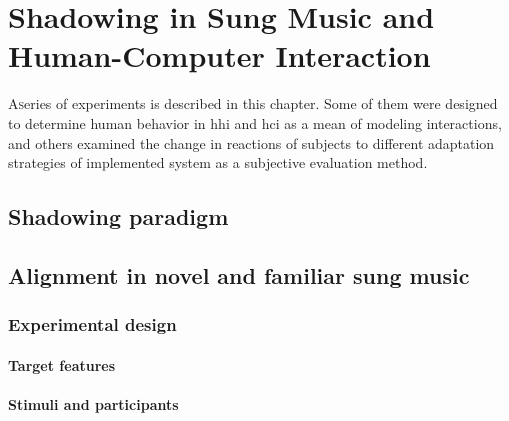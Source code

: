 \chapter{Shadowing in Sung Music and Human-Computer Interaction}
\label{chap:shadowing_in_sung_music_and_human_computer_interaction}

\lettrine{A} series of experiments is described in this chapter.
Some of them were designed to determine human behavior in \acl{hhi} and \ac{hci} as a mean of modeling interactions, and others examined the change in reactions of subjects to different adaptation strategies of implemented system as a subjective evaluation method.

\pagebreak

\section{Shadowing paradigm}
\label{sec:shadowing_paradigm}


\section{Alignment in novel and familiar sung music}
\label{sec:alignment_in_novel_and_familiar_sung_music}


\subsection{Experimental design}
\label{subsec:design_music}

\subsubsection{Target features}
\label{subsubsec:target_features_music}

\subsubsection{Stimuli and participants}
\label{subsubsection:stimuli_participants_music}

